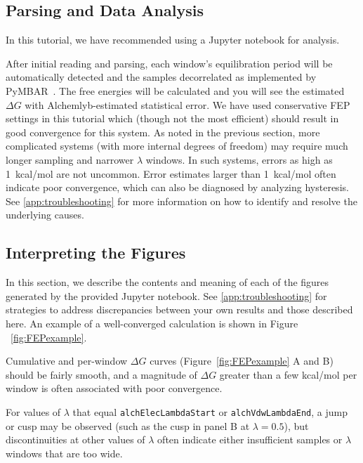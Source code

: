 \documentclass[9pt,tutorial,pubversion]{Styling/livecoms}
\newcommand{\textInput}[1]{\texttt{#1}}
\begin{document}
\subsection{Parsing and Data Analysis}\label{app:Analysis}
In this tutorial, we have recommended using a Jupyter notebook for analysis. 

After initial reading and parsing, each window's equilibration period will be automatically detected and the samples decorrelated as implemented by PyMBAR~\cite{shirts2008statistically}. The free energies will be calculated and you will see the estimated $\Delta G$ with Alchemlyb-estimated statistical error. We have used conservative FEP settings in this tutorial which (though not the most efficient) should result in good convergence for this system. As noted in the previous section, more complicated systems (with more internal degrees of freedom) may require much longer sampling and narrower $\lambda$ windows. In such systems,  errors as high as 1~kcal/mol are not uncommon. Error estimates larger than 1~kcal/mol often indicate poor convergence, which can also be diagnosed by analyzing hysteresis. See \ref{app:troubleshooting} for more information on how to identify and resolve the underlying causes.

\subsection{Interpreting the Figures}\label{app:InterpretingFEP}
In this section, we describe the contents and meaning of each of the figures generated by the provided Jupyter notebook. See \ref{app:troubleshooting} for strategies to address discrepancies between your own results and those described here. An example of a well-converged calculation is shown in Figure ~\ref{fig:FEPexample}.

Cumulative and per-window $\Delta G$ curves (Figure~\ref{fig:FEPexample} A and B) should be fairly smooth, and a magnitude of $\Delta G$ greater than a few kcal/mol per window is often associated with poor convergence.

For values of $\lambda$ that equal \textInput{alchElecLambdaStart} or \textInput{alchVdwLambdaEnd}, a jump or cusp may be observed (such as the cusp in panel B at $\lambda = 0.5$), but discontinuities at other values of $\lambda$ often indicate either insufficient samples or $\lambda$ windows that are too wide.
\end{document}
